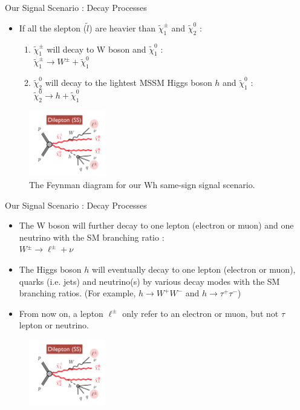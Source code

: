 \documentclass[mathserif,serif]{beamer}
\begin{document}
\begin{frame}{Our Signal Scenario : Decay Processes}
\begin{itemize}
\item If all the slepton ($\tilde{l}$) are heavier than $\tilde{\chi}_1^\pm$ and $\tilde{\chi}_2^0$ :
\begin{enumerate}
\item $\tilde{\chi}_1^\pm$ will decay to W boson and $\tilde{\chi}_1^0$ : \\
$\tilde{\chi}_1^\pm \rightarrow W^{\pm} + \tilde{\chi}_1^0$
\item $\tilde{\chi}_2^0$ will decay to the lightest MSSM Higgs boson $h$ and $\tilde{\chi}_1^0$ : \\
$\tilde{\chi}_2^0 \rightarrow h + \tilde{\chi}_1^0$
\end{enumerate}
\end{itemize}
\begin{figure}
\centering
\includegraphics[width=0.3\textwidth]{data/photo/theory/signal_feynman.png}
\caption{The Feynman diagram for our Wh same-sign signal scenario.}
\end{figure}
\end{frame}

\begin{frame}{Our Signal Scenario : Decay Processes}
\begin{itemize}
\item The W boson will further decay to one lepton (electron or muon) and one neutrino with the SM branching ratio : \\
$W{^\pm} \rightarrow \ell^{\pm} + \nu$
\item The Higgs boson $h$ will eventually decay to one lepton (electron or muon), quarks (i.e. jets) and neutrino(s) by various decay modes with the SM branching ratios. (For example, $h \rightarrow W^{+} W^{-} $ and $h \rightarrow \tau^{+} \tau^{-} $)
\item From now on, a lepton $\ell^{\pm}$ only refer to an electron or muon, but not $\tau$ lepton or neutrino.
\end{itemize}
\begin{figure}
\centering
\includegraphics[width=0.3\textwidth]{data/photo/theory/signal_feynman.png}
\end{figure}
\end{frame}
\end{document}
